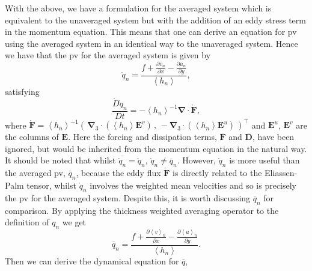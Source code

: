 \documentclass[12pt,a4paper]{report}
\newcommand*\thkmean[1]{\overline{#1}}
\newcommand*\nthkmean[1]{\left\langle{#1}\right\rangle}
\newcommand*\spec[1]{\mathring{#1}}
\newcommand*{\partialdiff}[2][{}]{\frac{\partial #1}{\partial #2}}
\begin{document}
    With the above, we have a formulation for the 
    averaged system which is equivalent to the
    unaveraged system but with the addition of an
    eddy stress term in the momentum equation.
    This means that one can derive an equation for \gls{pv} using the averaged system
    in an identical way to the unaveraged 
    system. Hence we have that the \gls{pv} for
    the averaged system is given by 
    \begin{equation}
    \spec{q}_{n} =
    \frac{f+\partialdiff[\thkmean{v}_{n}]{x}-\partialdiff[\thkmean{u}_{n}]{y}}
    {\nthkmean{h_{n}}},
    \end{equation} 
    satisfying
    \begin{equation}
    \frac{\spec{D}\spec{q}_{n}}{D t} 
    =   -\nthkmean{h_{n}}^{-1}
    \boldsymbol{\nabla}
    \cdot\boldsymbol{\spec{F}},
    \label{avpveq}
    \end{equation} 
    where $
    \boldsymbol{\spec{F}}
    =   \nthkmean{h_{n}}^{-1}\left( \,
    \boldsymbol{\nabla}_{3}
    \cdot(\nthkmean{h_{n}}
    \boldsymbol{E}^{v}) \, , \,
    - \boldsymbol{\nabla}_{3}
    \cdot(\nthkmean{h_{n}}
    \boldsymbol{E}^{u}) \, \right)^\top  $ and $\boldsymbol{E}^{u}$,  $\boldsymbol{E}^{v}$ are the
    columns of  $\boldsymbol{E}$. Here the forcing and dissipation terms, $\thkmean{
    	\boldsymbol{F}}$ and $\thkmean{
    	\boldsymbol{D}}$, have been ignored, but
    would be inherited from the momentum
    equation in the natural way. It should be noted that whilst $\thkmean{\spec{q}_{n}} = \spec{q}_{n}$, $\spec{q}_{n} \neq \thkmean{q}_{n}$.  However,
    $\spec{q}_{n}$ is 
    more useful than the averaged \gls{pv}, $\thkmean{q}_{n}$, because the eddy flux $
    \boldsymbol{\spec{F}} $ is directly related to the Eliassen-Palm tensor, whilst  $\spec{q}_{n}$ involves
    the weighted mean velocities and so is precisely the \gls{pv} for the averaged system. 
    Despite this, it is worth discussing $\thkmean{q}_{n}$ for 
    comparison. By applying the thickness weighted averaging operator to the 
    definition of $q_{n}$ we get 
    \begin{equation}
    \thkmean{q}_{n} =
    \frac{f+\partialdiff[\nthkmean{v}_{n}]{x}-\partialdiff[\nthkmean{u}_{n}]{y}}
    {\nthkmean{h_{n}}}.
    \end{equation} 
    Then we can derive the dynamical equation for
    $ \thkmean{q}$,
\end{document}
